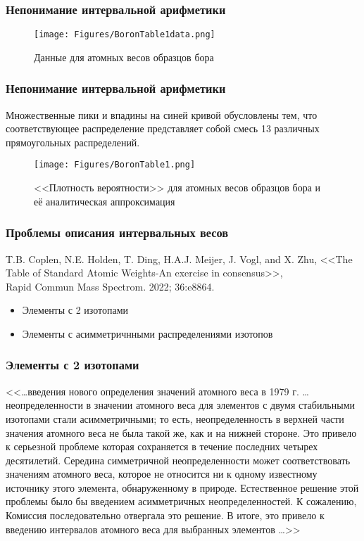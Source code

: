 \begin{frame}
	\frametitle{Непонимание интервальной арифметики}
	
	\begin{figure}[ht] 
		\centering\small
		\unitlength=1mm
		\texttt{[image: Figures/BoronTable1data.png]}
		\caption{Данные для атомных весов образцов бора} 
		\label{f:BoronTable1data}
	\end{figure}	
	
	
\end{frame}

\begin{frame}
	\frametitle{Непонимание интервальной арифметики}
Множественные пики и впадины на синей кривой обусловлены тем, что соответствующее распределение представляет собой смесь 13 различных прямоугольных распределений.
\begin{figure}[ht] 
	\centering\small
	\unitlength=1mm
	\texttt{[image: Figures/BoronTable1.png]}
	\caption{<<Плотность вероятности>> для атомных весов образцов бора и её аналитическая аппроксимация} 
	\label{f:BoronTable1}
\end{figure}	
	
	
\end{frame}

\begin{frame}
\frametitle{Проблемы описания интервальных весов}
T.B. Coplen, N.E. Holden, T. Ding, H.A.J. Meijer, J. Vogl, and X. Zhu, <<The Table of Standard Atomic Weights-An exercise in consensus>>, \\ Rapid Commun Mass Spectrom. 2022; 36:e8864. %

\begin{itemize}
	\item Элементы с 2 изотопами
	\item Элементы с асимметричнными распределениями изотопов
\end{itemize}

\end{frame}

\begin{frame}
	\frametitle{Элементы с 2 изотопами }
<<\ldots введения нового определения значений атомного веса в 1979 г.
\ldots неопределенности в значении атомного веса для элементов с двумя стабильными изотопами стали асимметричными; то есть, неопределенность в верхней части значения атомного веса не была
такой же, как и на нижней стороне. Это привело к серьезной проблеме
которая сохраняется в течение последних четырех десятилетий. Середина симметричной неопределенности может соответствовать значениям атомного веса, которое не относится ни к одному известному источнику этого элемента, обнаруженному в природе. Естественное решение этой проблемы
было бы введением асимметричных неопределенностей. К сожалению,
Комиссия последовательно отвергала это решение. В итоге,
это привело к введению интервалов атомного веса для
выбранных элементов \ldots >>
\end{frame}

